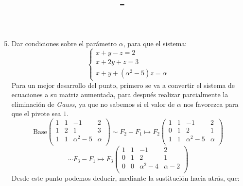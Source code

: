 \documentclass{article}
\author{\MyAuthor{}}
\title{\MyClass{} \-- \MyTitle{}}
\begin{document}
\maketitle

\begin{enumerate}
    \setcounter{enumi}{4}
    \item Dar condiciones sobre el parámetro \(\alpha\), para que el sistema:
        \[
            \left\{
                \begin{aligned}
                    x + y - z = 2 \\
                    x + 2y + z = 3 \\
                    x + y + \left(\alpha^2 - 5\right)z = \alpha
                \end{aligned}
            \right.
        \]
        Para un mejor desarrollo del punto, primero se va a convertir el sistema de ecuaciones a su matriz aumentada, 
        para después realizar parcialmente la eliminación de \emph{Gauss}, ya que no sabemos si el valor de \(\alpha\) nos favorezca para que el pivote sea \(1\).
        \[
            \text{Base}
            \left(
            \begin{array}{ccc|c}
                1 & 1 & -1 & 2 \\
                1 & 2 & 1 & 3 \\
                1 & 1 & \alpha^2 -5 & \alpha \\
            \end{array}
            \right)
            \sim
            F_2 - F_1 \mapsto F_2
            \left(
            \begin{array}{ccc|c}
                1 & 1 & -1 & 2 \\
                0 & 1 & 2 & 1 \\
                1 & 1 & \alpha^2 - 5 & \alpha \\
            \end{array}
            \right)
        \]
        \[
            \sim
            F_3 - F_1 \mapsto F_3
            \left(
            \begin{array}{ccc|c}
                1 & 1 & -1 & 2 \\
                0 & 1 & 2 & 1 \\
                0 & 0 & \alpha^2 - 4 & \alpha - 2 \\
            \end{array}
            \right)
        \]
        Desde este punto podemos deducir, mediante la sustitución hacia atrás, que:

\end{enumerate}
\end{document}
